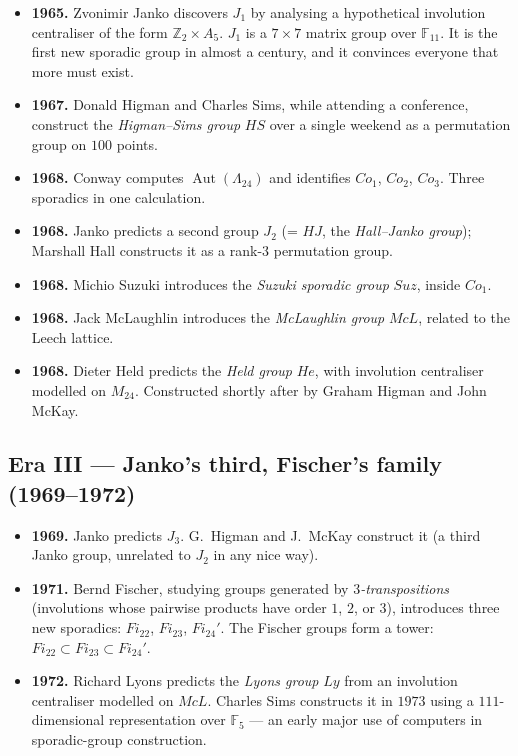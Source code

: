 \documentclass[11pt]{article}
\newcommand{\Z}{\mathbb{Z}}
\begin{document}
\begin{itemize}[leftmargin=*, itemsep=2pt]
  \item \textbf{1965.} Zvonimir Janko discovers $J_1$ by analysing a
        hypothetical involution centraliser of the form
        $\Z_2 \times A_5$. $J_1$ is a $7\times 7$ matrix group over
        $\mathbb{F}_{11}$. It is the first new sporadic group in
        almost a century, and it convinces everyone that more must
        exist.
  \item \textbf{1967.} Donald Higman and Charles Sims, while
        attending a conference, construct the
        \emph{Higman--Sims group} $\mathit{HS}$ over a single
        weekend as a permutation group on $100$ points.
  \item \textbf{1968.} Conway computes
        $\operatorname{Aut}(\Lambda_{24})$ and identifies
        $\mathit{Co}_1$, $\mathit{Co}_2$, $\mathit{Co}_3$. Three
        sporadics in one calculation.
  \item \textbf{1968.} Janko predicts a second group $J_2$
        (= $\mathit{HJ}$, the \emph{Hall--Janko group}); Marshall
        Hall constructs it as a rank-$3$ permutation group.
  \item \textbf{1968.} Michio Suzuki introduces the \emph{Suzuki
        sporadic group} $\mathit{Suz}$, inside $\mathit{Co}_1$.
  \item \textbf{1968.} Jack McLaughlin introduces the
        \emph{McLaughlin group} $\mathit{McL}$, related to the Leech
        lattice.
  \item \textbf{1968.} Dieter Held predicts the \emph{Held group}
        $\mathit{He}$, with involution centraliser modelled on
        $M_{24}$. Constructed shortly after by Graham Higman and
        John McKay.
\end{itemize}

\subsection*{Era III --- Janko's third, Fischer's family (1969--1972)}

\begin{itemize}[leftmargin=*, itemsep=2pt]
  \item \textbf{1969.} Janko predicts $J_3$. G.\ Higman and J.\ McKay
        construct it (a third Janko group, unrelated to $J_2$ in any
        nice way).
  \item \textbf{1971.} Bernd Fischer, studying groups generated by
        \emph{$3$-transpositions} (involutions whose pairwise
        products have order $1$, $2$, or $3$), introduces three new
        sporadics: $\mathit{Fi}_{22}$, $\mathit{Fi}_{23}$,
        $\mathit{Fi}_{24}'$. The Fischer groups form a tower:
        $\mathit{Fi}_{22} \subset \mathit{Fi}_{23} \subset
        \mathit{Fi}_{24}'$.
  \item \textbf{1972.} Richard Lyons predicts the \emph{Lyons group}
        $\mathit{Ly}$ from an involution centraliser modelled on
        $\mathit{McL}$. Charles Sims constructs it in $1973$ using a
        $111$-dimensional representation over $\mathbb{F}_5$ ---
        an early major use of computers in sporadic-group
        construction.
\end{itemize}
\end{document}
